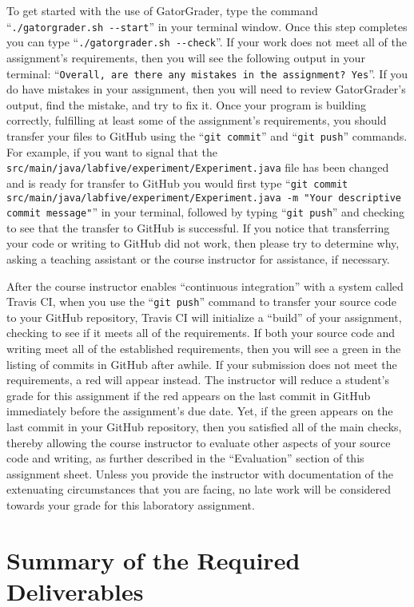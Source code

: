 \documentclass[11pt]{article}
\newcommand{\mainprogramsource}{\lstinline{src/main/java/labfive/experiment/Experiment.java}}
\newcommand{\gatorgraderstart}{\command{./gatorgrader.sh --start}}
\newcommand{\gatorgradercheck}{\command{./gatorgrader.sh --check}}
\newcommand{\gitcommit}{\command{git commit}}
\newcommand{\gitpush}{\command{git push}}
\newcommand{\gitcommitmainprogram}{\command{git commit src/main/java/labfive/experiment/Experiment.java -m "Your
descriptive commit message"}}
\newcommand{\command}[1]{``\lstinline{#1}''}
\newcommand{\step}[1]{``{#1}''}
\newcommand{\checkmark}{\ding{51}}
\newcommand{\naughtmark}{\ding{55}}
\begin{document}
To get started with the use of GatorGrader, type the command \gatorgraderstart{}
in your terminal window. Once this step completes you can type
\gatorgradercheck{}. If your work does not meet all of the assignment's
requirements, then you will see the following output in your terminal:
\command{Overall, are there any mistakes in the assignment? Yes}. If you do have
mistakes in your assignment, then you will need to review GatorGrader's output,
find the mistake, and try to fix it. Once your program is building correctly,
fulfilling at least some of the assignment's requirements, you should transfer
your files to GitHub using the \gitcommit{} and \gitpush{} commands. For
example, if you want to signal that the \mainprogramsource{} file has been
changed and is ready for transfer to GitHub you would first type
\gitcommitmainprogram{} in your terminal, followed by typing \gitpush{} and
checking to see that the transfer to GitHub is successful. If you notice that
transferring your code or writing to GitHub did not work, then please try to
determine why, asking a teaching assistant or the course instructor for
assistance, if necessary.

After the course instructor enables \step{continuous integration} with a system called Travis CI, when you use the
\gitpush{} command to transfer your source code to your GitHub repository, Travis CI will initialize a \step{build} of
your assignment, checking to see if it meets all of the requirements. If both your source code and writing meet all of
the established requirements, then you will see a green \checkmark{} in the listing of commits in GitHub after awhile.
If your submission does not meet the requirements, a red \naughtmark{} will appear instead. The instructor will reduce a
student's grade for this assignment if the red \naughtmark{} appears on the last commit in GitHub immediately before the
assignment's due date. Yet, if the green \checkmark{} appears on the last commit in your GitHub repository, then you
satisfied all of the main checks, thereby allowing the course instructor to evaluate other aspects of your source code
and writing, as further described in the \step{Evaluation} section of this assignment sheet. Unless you provide the
instructor with documentation of the extenuating circumstances that you are facing, no late work will be considered
towards your grade for this laboratory assignment.

\section*{Summary of the Required Deliverables}
\end{document}
